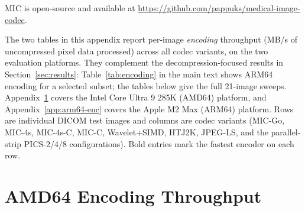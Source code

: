 \documentclass[journal]{IEEEtran}
\begin{document}
MIC is open-source and available at
\url{https://github.com/pappuks/medical-image-codec}.

\appendices

The two tables in this appendix report per-image \emph{encoding} throughput
(MB/s of uncompressed pixel data processed) across all codec variants, on
the two evaluation platforms. They complement the decompression-focused
results in Section~\ref{sec:results}: Table~\ref{tab:encoding} in the main
text shows ARM64 encoding for a selected subset; the tables below give the
full 21-image sweeps. Appendix~\ref{app:amd64-enc} covers the Intel Core
Ultra 9 285K (AMD64) platform, and Appendix~\ref{app:arm64-enc} covers the
Apple M2 Max (ARM64) platform. Rows are individual DICOM test images and
columns are codec variants (MIC-Go, MIC-4s, MIC-4s-C, MIC-C, Wavelet+SIMD,
HTJ2K, JPEG-LS, and the parallel-strip PICS-2/4/8 configurations). Bold
entries mark the fastest encoder on each row.

\section{AMD64 Encoding Throughput}
\label{app:amd64-enc}
\end{document}
